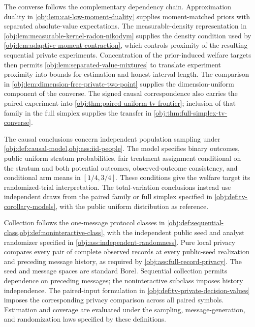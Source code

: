 \documentclass[11pt]{article}
\begin{document}
The converse follows the complementary dependency chain. Approximation duality in \cref{obj:lem:cai-low-moment-duality} supplies moment-matched priors with separated absolute-value expectations. The measurable-density representation in \cref{obj:lem:measurable-kernel-radon-nikodym} supplies the density condition used by \cref{obj:lem:adaptive-moment-contraction}, which controls proximity of the resulting sequential private experiments. Concentration of the prior-induced welfare targets then permits \cref{obj:lem:separated-value-mixtures} to translate experiment proximity into bounds for estimation and honest interval length. The comparison in \cref{obj:lem:dimension-free-private-two-point} supplies the dimension-uniform component of the converse. The signed causal correspondence also carries the paired experiment into \cref{obj:thm:paired-uniform-tv-frontier}; inclusion of that family in the full simplex supplies the transfer in \cref{obj:thm:full-simplex-tv-converse}.

The causal conclusions concern independent population sampling under \cref{obj:def:causal-model,obj:ass:iid-people}. The model specifies binary outcomes, public uniform stratum probabilities, fair treatment assignment conditional on the stratum and both potential outcomes, observed-outcome consistency, and conditional arm means in \([1/4,3/4]\). These conditions give the welfare target its randomized-trial interpretation. The total-variation conclusions instead use independent draws from the paired family or full simplex specified in \cref{obj:def:tv-corollary-models}, with the public uniform distribution as reference.

Collection follows the one-message protocol classes in \cref{obj:def:sequential-class,obj:def:noninteractive-class}, with the independent public seed and analyst randomizer specified in \cref{obj:ass:independent-randomness}. Pure local privacy compares every pair of complete observed records at every public-seed realization and preceding message history, as required by \cref{obj:ass:full-record-privacy}. The seed and message spaces are standard Borel. Sequential collection permits dependence on preceding messages; the noninteractive subclass imposes history independence. The paired-input formulation in \cref{obj:def:tv-private-decision-values} imposes the corresponding privacy comparison across all paired symbols. Estimation and coverage are evaluated under the sampling, message-generation, and randomization laws specified by these definitions.
\end{document}
